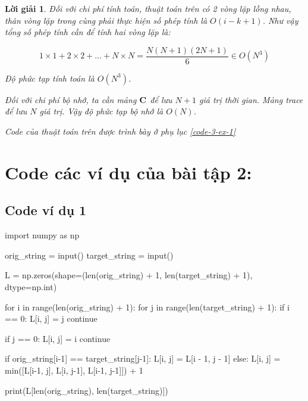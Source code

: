 \documentclass[14pt, a4paper]{article}
\theoremstyle{sltheorem}
\theoremstyle{soltheorem}
\newtheorem*{loigiai}{Lời giải}
\begin{document}
\begin{loigiai}
    Đối với chi phí tính toán, thuật toán trên có 2 vòng lặp lồng nhau, thân vòng lặp trong cùng phải thực hiện số phép tính là $O(i-k+1)$.
    Như vậy tổng số phép tính cần để tính hai vòng lặp là:

    \begin{equation*}
        1 \times 1 + 2 \times 2 + \dots + N \times N = \dfrac{N (N+1)(2N + 1)}{6} \in O(N^3)
    \end{equation*}

    Độ phức tạp tính toán là $O(N^3)$.

    Đối với chi phí bộ nhớ, ta cần mảng $\bold{C}$ để lưu $N+1$ giá trị thời gian. Mảng trace để lưu $N$ giá trị.
    Vậy độ phức tạp bộ nhớ là $O(N)$.

    Code của thuật toán trên được trình bày ở phụ lục \ref{code-3-ex-1}
    \end{loigiai}

    
    \newpage
    \printbibliography[title={TÀI LIỆU THAM KHẢO}]

    \newpage

    \appendix

    \section{Code các ví dụ của bài tập 2:}

    \subsection{Code ví dụ 1} \label{code-1-ex-2}

    \begin{python}
import numpy as np
        
orig_string = input()
target_string = input()
        
L = np.zeros(shape=(len(orig_string) + 1, len(target_string) + 1), dtype=np.int)
        
        
for i in range(len(orig_string) + 1):
    for j in range(len(target_string) + 1):
        if i == 0:
            L[i, j] = j
            continue
        
        if j == 0:
            L[i, j] = i
            continue
        
        if orig_string[i-1] == target_string[j-1]:
            L[i, j] = L[i - 1, j - 1]
        else:
            L[i, j] = min([L[i-1, j], L[i, j-1], L[i-1, j-1]]) + 1
        
        
print(L[len(orig_string), len(target_string)])
                \end{python}
\end{document}
